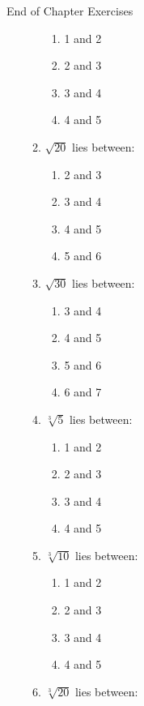 \begin{eocexercises}{End of Chapter Exercises}
\begin{enumerate}[itemsep=5pt, label=\textbf{\arabic*}. ]
\begin{enumerate}[itemsep=5pt, label=\textbf{\alph*}. ]
\label{m38347*id72245}\begin{enumerate}[itemsep=5pt, label=\textbf{\roman*}. ] 
            \item  1 and 2\item  2 and 3\item  3 and 4\item  4 and 5\end{enumerate}
        \item 
              $\sqrt{20}$ lies between:
\label{m38347*id72345}\begin{enumerate}[itemsep=5pt, label=\textbf{\roman*}. ] 
            \item 2 and 3\item 3 and 4\item 4 and 5\item 5 and 6\end{enumerate}
                      \item $\sqrt{30}$ lies between:
\label{m38347*id722643}\begin{enumerate}[itemsep=5pt, label=\textbf{\roman*}. ] 
            \item 3 and 4\item 4 and 5\item 5 and 6\item 6 and 7\end{enumerate}
                      \item $\sqrt[3]{5}$ lies between:
\label{m38347*id7351}\begin{enumerate}[itemsep=5pt, label=\textbf{\roman*}. ] 
            \item  1 and 2\item  2 and 3\item  3 and 4\item  4 and 5\end{enumerate}
                     \item $\sqrt[3]{10}$ lies between:
\label{m38347*id76451}\begin{enumerate}[itemsep=5pt, label=\textbf{\roman*}. ] 
            \item  1 and 2\item  2 and 3\item  3 and 4\item  4 and 5\end{enumerate}
                      \item $\sqrt[3]{20}$ lies between:
\label{m38347*id7334}\begin{enumerate}[itemsep=5pt, label=\textbf{\roman*}. ] 

\end{enumerate}
\end{enumerate}
\end{enumerate}
\end{eocexercises}
